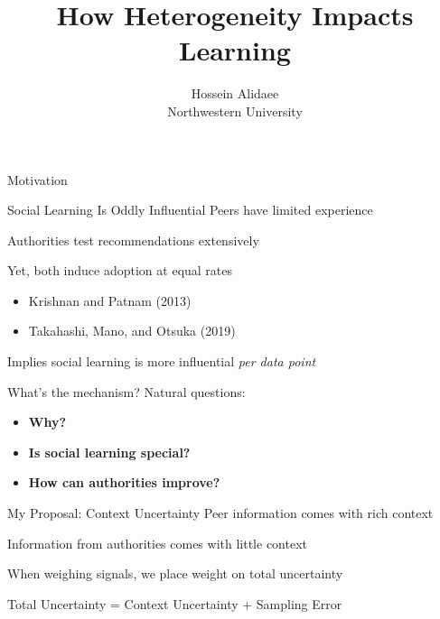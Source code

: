\documentclass[
  ignorenonframetext,
]{beamer}
\title{How Heterogeneity Impacts Learning}
\author{Hossein Alidaee\\
Northwestern University}
\date{}
\providecommand{\tightlist}{%
  \setlength{\itemsep}{0pt}\setlength{\parskip}{0pt}}\usepackage{longtable,booktabs,array}
\begin{document}
\frame{\titlepage}
\ifdefined\Shaded\renewenvironment{Shaded}{\begin{tcolorbox}[boxrule=0pt, enhanced, interior hidden, borderline west={3pt}{0pt}{shadecolor}, frame hidden, breakable, sharp corners]}{\end{tcolorbox}}\fi

\begin{frame}{Motivation}
\protect\hypertarget{motivation}{}
\end{frame}

\begin{frame}{Social Learning Is Oddly Influential}
\protect\hypertarget{social-learning-is-oddly-influential}{}
Peers have limited experience

Authorities test recommendations extensively

Yet, both induce adoption at equal rates

\begin{itemize}
\tightlist
\item
  Krishnan and Patnam (2013)
\item
  Takahashi, Mano, and Otsuka (2019)
\end{itemize}

Implies social learning is more influential \emph{per data point}
\end{frame}

\begin{frame}{What's the mechanism?}
\protect\hypertarget{whats-the-mechanism}{}
Natural questions:

\begin{itemize}[<+->]
\tightlist
\item
  \textbf{Why?}
\item
  \textbf{Is social learning special?}
\item
  \textbf{How can authorities improve?}
\end{itemize}
\end{frame}

\begin{frame}{My Proposal: Context Uncertainty}
\protect\hypertarget{my-proposal-context-uncertainty}{}
Peer information comes with rich context

Information from authorities comes with little context

When weighing signals, we place weight on total uncertainty

Total Uncertainty = Context Uncertainty + Sampling Error
\end{frame}
\end{document}
